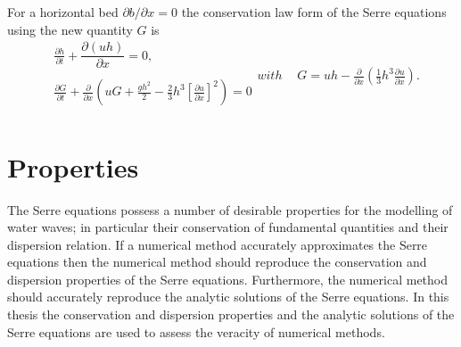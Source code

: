 For a horizontal bed $\partial b / \partial x = 0$ the conservation law form of the Serre equations using the new quantity $G$ is
\begin{subequations}
	\label{eqn:FullSerreConHorizBed}
	\begin{align}
	&\frac{\partial h}{\partial t} + \dfrac{\partial (uh)}{\partial x} = 0, \label{eqn:FullSerreConMassHorizBed} \\  \nonumber \\
	&\frac{\partial G}{\partial t}   + \frac{\partial}{\partial x} \left( {u} G + \frac{gh^2}{2} - \frac{2}{3}h^3 \left[\frac{\partial {u}}{\partial x}\right]^2 \right) = 0 \label{eqn:SerreconsconmomHorizBed}\\ \nonumber 
	\end{align}
	with
	\begin{align}
	&G =  {u}h  - \frac{\partial}{\partial x}\left(\frac{1}{3}h^3  \frac{\partial {u}}{\partial x}\right). \label{defn:SerreEqnConservedQuantity1HorizBed}
	\end{align}
\end{subequations}


\section{Properties}
The Serre equations possess a number of desirable properties for the modelling of water waves; in particular their conservation of fundamental quantities and their dispersion relation. If a numerical method accurately approximates the Serre equations then the numerical method should reproduce the conservation and dispersion properties of the Serre equations. Furthermore, the numerical method should accurately reproduce the analytic solutions of the Serre equations. In this thesis the conservation and dispersion properties and the analytic solutions of the Serre equations are used to assess the veracity of numerical methods. 

%

